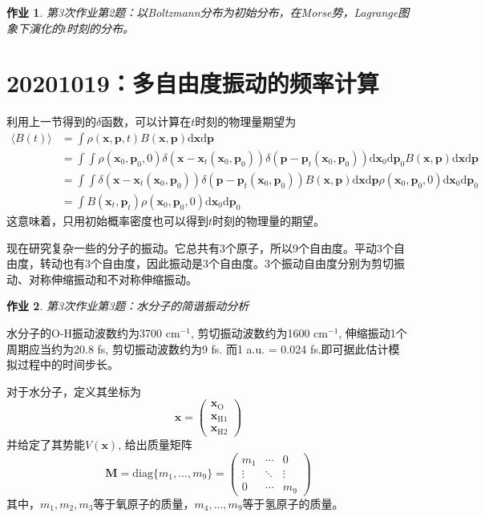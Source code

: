 \documentclass[12pt]{article}
\newtheorem{asg}{作业}
\begin{document}
\begin{asg}
    第3次作业第2题：以Boltzmann分布为初始分布，在Morse势，Lagrange图象下演化的$t$时刻的分布。
\end{asg}

\section{20201019：多自由度振动的频率计算}

利用上一节得到的$\delta$函数，可以计算在$t$时刻的物理量期望为
\begin{align*}
    \langle B(t) \rangle &= \int \rho(\bm{x},\bm{p},t) B(\bm{x},\bm{p}) \mathrm{d}\bm{x}\mathrm{d}\bm{p}\\
    &= \int \int \rho(\bm{x}_0,\bm{p}_0,0)\delta(\bm{x}-\bm{x}_t(\bm{x}_0,\bm{p}_0)) \delta(\bm{p}-\bm{p}_t(\bm{x}_0,\bm{p}_0)) \mathrm{d}\bm{x}_0\mathrm{d}\bm{p}_0 B(\bm{x},\bm{p}) \mathrm{d}\bm{x}\mathrm{d}\bm{p}\\
    &= \int \int \delta(\bm{x}-\bm{x}_t(\bm{x}_0,\bm{p}_0)) \delta(\bm{p}-\bm{p}_t(\bm{x}_0,\bm{p}_0)) B(\bm{x},\bm{p}) \mathrm{d}\bm{x}\mathrm{d}\bm{p} \rho(\bm{x}_0,\bm{p}_0,0) \mathrm{d}\bm{x}_0\mathrm{d}\bm{p}_0\\
    &= \int B(\bm{x}_t,\bm{p}_t) \rho(\bm{x}_0,\bm{p}_0,0)\mathrm{d}\bm{x}_0\mathrm{d}\bm{p}_0
\end{align*}
这意味着，只用初始概率密度也可以得到$t$时刻的物理量的期望。

现在研究复杂一些的分子的振动。它总共有3个原子，所以9个自由度。平动3个自由度，转动也有3个自由度，因此振动是3个自由度。3个振动自由度分别为剪切振动、对称伸缩振动和不对称伸缩振动。
\begin{asg}
    第3次作业第3题：水分子的简谐振动分析
\end{asg}
水分子的O-H振动波数约为3700 cm$^{-1}$, 剪切振动波数约为1600 cm$^{-1}$, 伸缩振动1个周期应当约为20.8 fs, 剪切振动波数约为9 fs. 而1 a.u. = 0.024 fs.即可据此估计模拟过程中的时间步长。

对于水分子，定义其坐标为
\begin{equation*}
    \bm{x} = 
    \begin{pmatrix}
        \bm{x}_\mathrm{O}\\
        \bm{x}_{\mathrm{H1}}\\
        \bm{x}_{\mathrm{H2}}
    \end{pmatrix}
\end{equation*}
并给定了其势能$V(\bm{x})$, 给出质量矩阵
\begin{equation*}
    \bm{M} = \mathrm{diag} \{m_1,...,m_9 \} = 
    \begin{pmatrix}
        m_1 & \cdots & 0\\
        \vdots & \ddots & \vdots\\
        0 & \cdots & m_9
    \end{pmatrix}
\end{equation*}
其中，$m_1,m_2,m_3$等于氧原子的质量，$m_4,...,m_9$等于氢原子的质量。
\end{document}

